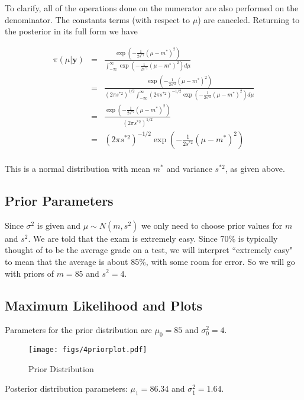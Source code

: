 \documentclass[12pt]{article}
\begin{document}
\noindent To clarify, all of the operations done on the numerator are also performed on the denominator. The constants terms (with respect to $\mu$) are canceled. Returning to the posterior in its full form we have

\begin{eqnarray*}
\pi(\mu|\mathbf{y}) &=& \frac{\exp(-\frac{1}{2s^{*2}}(\mu-m^*)^2)}{\int_{-\infty}^\infty \exp(-\frac{1}{2s^{*2}}(\mu-m^*)^2)d\mu} \\
&=& \frac{\exp(-\frac{1}{2s^{*2}}(\mu-m^*)^2)}{(2\pi s^{*2})^{1/2}\int_{-\infty}^\infty(2\pi s^{*2})^{-1/2}\exp(-\frac{1}{2s^{*2}}(\mu-m^*)^2)d\mu} \\
&=& \frac{\exp(-\frac{1}{2s^{*2}}(\mu-m^*)^2)}{(2\pi s^{*2})^{1/2}} \\
&=& (2\pi s^{*2})^{-1/2}\exp\left(-\frac{1}{2s^{*2}}(\mu-m^*)^2\right) \\
\end{eqnarray*}

\noindent This is a normal distribution with mean $m^*$ and variance $s^{*2}$, as given above.

\subsection{Prior Parameters}

\noindent Since $\sigma^2$ is given and $\mu\sim N(m,s^2)$ we only need to choose prior values for $m$ and $s^2$.  We are told that the exam is extremely easy.  Since 70\% is typically thought of to be the average grade on a test, we will interpret ``extremely easy" to mean that the average is about 85\%, with some room for error.  So we will go with priors of $m=85$ and $s^2=4$.
\bigskip

\subsection{Maximum Likelihood and Plots}

\noindent Parameters for the prior distribution are $\mu_0=85$ and $\sigma_0^2=4$.

\begin{figure}[H]
\begin{center}
\texttt{[image: figs/4priorplot.pdf]}
\caption{Prior Distribution}
\end{center}
\end{figure}

\noindent Posterior distribution parameters: $\mu_1=86.34$ and $\sigma_1^2=1.64$.
\end{document}

